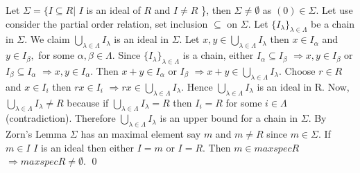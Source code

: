 \documentclass[11pt]{amsart}
\begin{document}
\proof Let $\Sigma=\{I\subseteq R|$ $I$ is an ideal of $R$ and $I\neq R$ \}, then $\Sigma\neq \emptyset$ as $(0)\in \Sigma.$ Let use consider the partial order relation, set inclusion $\subseteq$ on $\Sigma.$ Let $\{I_{\lambda} \}_{\lambda \in \Lambda}$ be a chain in $\Sigma.$ We claim ${\displaystyle\bigcup_{\lambda \in \Lambda}I_{\lambda}}$ is an ideal in $\Sigma.$ Let $x,y \in {\displaystyle\bigcup_{\lambda \in \Lambda}I_{\lambda}}$ then $x\in I_{\alpha}$ and $y\in I_{\beta},$ for some $\alpha, \beta \in \Lambda.$ Since $\{I_{\lambda} \}_{\lambda \in \Lambda}$ is a chain, either $I_{\alpha} \subseteq I_{\beta}$ $\Rightarrow x,y \in I_{\beta}$ or $I_{\beta} \subseteq I_{\alpha}$ $\Rightarrow x,y \in I_{\alpha}.$ Then $x+y\in I_{\alpha}$ or $I_{\beta}$ $\Rightarrow x+y \in {\displaystyle\bigcup_{\lambda \in \Lambda}I_{\lambda}}.$ Choose $r\in R$ and $x\in I_{i}$ then $rx\in I_{i}$ $\Rightarrow rx\in {\displaystyle\bigcup_{\lambda \in \Lambda}I_{\lambda}}.$ Hence ${\displaystyle\bigcup_{\lambda \in \Lambda}I_{\lambda}}$ is an ideal in R. Now, ${\displaystyle\bigcup_{\lambda \in \Lambda}I_{\lambda}}\neq R$ because if ${\displaystyle\bigcup_{\lambda \in \Lambda}I_{\lambda}} =R$ then $I_{i}=R$ for some $i\in \Lambda$ (contradiction). Therefore ${\displaystyle\bigcup_{\lambda \in \Lambda}I_{\lambda}}$ is an upper bound for a chain in $\Sigma.$ By Zorn's Lemma $\Sigma$ has an maximal element say $m$ and $m\neq R$ since $m \in \Sigma.$ If $m\in I$ $I$ is an ideal then either $I=m$ or $I=R.$ Then $m\in maxspecR$ $\Rightarrow maxspecR \neq \emptyset.$ \qed 
\end{document}
